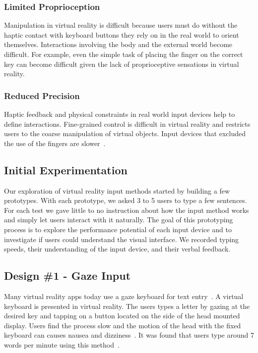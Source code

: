 \subsubsection{Limited Proprioception}
Manipulation in virtual reality is difficult because users must do without the haptic contact with keyboard buttons they rely on in the real world to orient themselves.
Interactions involving the body and the external world become difficult.
For example, even the simple task of placing the finger on the correct key can become difficult given the lack of proprioceptive sensations in virtual reality.

\subsubsection{Reduced Precision}
Haptic feedback and physical constraints in real world input devices help to define interactions. 
Fine-grained control is difficult in virtual reality and restricts users to the coarse manipulation of virtual objects.
Input devices that excluded the use of the fingers are slower~\cite{Zhai:1996:IMG:238386.238534}.  

\subsection{Initial Experimentation}

Our exploration of virtual reality input methods started by building a few prototypes.
With each prototype, we asked 3 to 5 users to type a few sentences.  
For each test we gave little to no instruction about how the input method works and simply let users interact with it naturally.
The goal of this prototyping process is to explore the performance potential of each input device and to investigate if users could understand the visual interface.
We recorded typing speeds, their understanding of the input device, and their verbal feedback.

\subsection{Design \#1 - Gaze Input}
Many virtual reality apps today use a gaze keyboard for text entry~\cite{netflix_app_for_oculus}.
A virtual keyboard is presented in virtual reality.
The users types a letter by gazing at the desired key and tapping on a button located on the side of the head mounted display.
Users find the process slow and the motion of the head with the fixed keyboard can causes nausea and dizziness~\cite{atienza2016interaction}.
It was found that users type around 7 words per minute using this method~\cite{majaranta2006effects}.

